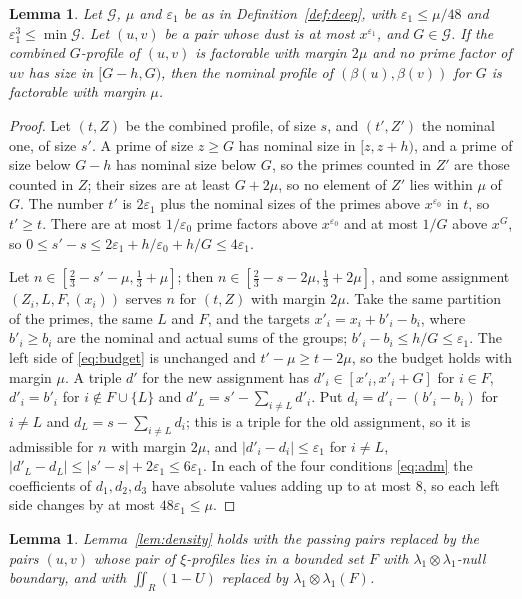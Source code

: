 \documentclass[aps,prd,twocolumn,superscriptaddress,nofootinbib,longbibliography,floatfix,showkeys,nobalancelastpage,amsmath,amssymb,10pt]{revtex4-2}
\theoremstyle{plain}
\newtheorem{lemma}[theorem]{Lemma}
\theoremstyle{definition}
\theoremstyle{plain}
\newcommand{\eps}{\varepsilon}
\begin{document}
\begin{lemma}\label{lem:stable}
Let $\mathcal G$, $\mu$ and $\eps_1$ be as in Definition~\ref{def:deep}, with $\eps_1\le\mu/48$ and $\eps_1^3\le\min\mathcal G$. Let $(u,v)$ be a pair whose dust is at most $x^{\eps_1}$, and $G\in\mathcal G$. If the combined $G$-profile of $(u,v)$ is factorable with margin $2\mu$ and no prime factor of $uv$ has size in $[G-h,G)$, then the nominal profile of $(\beta(u),\beta(v))$ for $G$ is factorable with margin $\mu$.
\end{lemma}

\begin{proof}
Let $(t,Z)$ be the combined profile, of size $s$, and $(t',Z')$ the nominal one, of size $s'$. A prime of size $z\ge G$ has nominal size in $[z,z+h)$, and a prime of size below $G-h$ has nominal size below $G$, so the primes counted in $Z'$ are those counted in $Z$; their sizes are at least $G+2\mu$, so no element of $Z'$ lies within $\mu$ of $G$. The number $t'$ is $2\eps_1$ plus the nominal sizes of the primes above $x^{\eps_0}$ in $t$, so $t'\ge t$. There are at most $1/\eps_0$ prime factors above $x^{\eps_0}$ and at most $1/G$ above $x^G$, so $0\le s'-s\le2\eps_1+h/\eps_0+h/G\le4\eps_1$.

Let $n\in[\frac23-s'-\mu,\frac13+\mu]$; then $n\in[\frac23-s-2\mu,\frac13+2\mu]$, and some assignment $(Z_i,L,F,(x_i))$ serves $n$ for $(t,Z)$ with margin $2\mu$. Take the same partition of the primes, the same $L$ and $F$, and the targets $x'_i=x_i+b'_i-b_i$, where $b'_i\ge b_i$ are the nominal and actual sums of the groups; $b'_i-b_i\le h/G\le\eps_1$. The left side of \eqref{eq:budget} is unchanged and $t'-\mu\ge t-2\mu$, so the budget holds with margin $\mu$. A triple $d'$ for the new assignment has $d'_i\in[x'_i,x'_i+G]$ for $i\in F$, $d'_i=b'_i$ for $i\notin F\cup\{L\}$ and $d'_L=s'-\sum_{i\ne L}d'_i$. Put $d_i=d'_i-(b'_i-b_i)$ for $i\ne L$ and $d_L=s-\sum_{i\ne L}d_i$; this is a triple for the old assignment, so it is admissible for $n$ with margin $2\mu$, and $|d'_i-d_i|\le\eps_1$ for $i\ne L$, $|d'_L-d_L|\le|s'-s|+2\eps_1\le6\eps_1$. In each of the four conditions \eqref{eq:adm} the coefficients of $d_1,d_2,d_3$ have absolute values adding up to at most $8$, so each left side changes by at most $48\eps_1\le\mu$.
\end{proof}

\begin{lemma}\label{lem:densityF}
Lemma~\ref{lem:density} holds with the passing pairs replaced by the pairs $(u,v)$ whose pair of $\xi$-profiles lies in a bounded set $F$ with $\lambda_1\otimes\lambda_1$-null boundary, and with $\iint_R(1-U)$ replaced by $\lambda_1\otimes\lambda_1(F)$.
\end{lemma}
\end{document}
